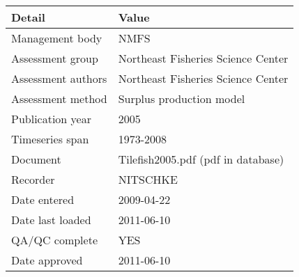 \begin{table}[htb]
\centering
\begin{tabular}{lp{7cm}}
\toprule
Detail & Value \\
\midrule
Management body    & NMFS                               \\
Assessment group   & Northeast Fisheries Science Center \\
Assessment authors & Northeast Fisheries Science Center \\
Assessment method  & Surplus production model           \\
Publication year   & 2005                               \\
Timeseries span    & 1973-2008                          \\
Document           & Tilefish2005.pdf (pdf in database) \\
Recorder           & NITSCHKE                           \\
Date entered       & 2009-04-22                         \\
Date last loaded   & 2011-06-10                         \\
QA/QC complete     & YES                                \\
Date approved      & 2011-06-10                         \\
\bottomrule
\end{tabular}
\label{tab:assessdet}
\end{table}
